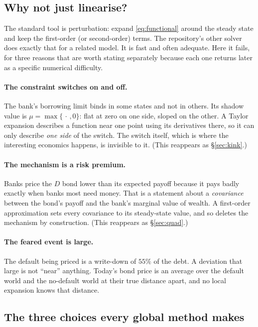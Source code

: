\documentclass[10pt,a4paper]{article}
\theoremstyle{plain}
\theoremstyle{remark}
\begin{document}
\subsection{Why not just linearise?}

The standard tool is perturbation: expand \eqref{eq:functional} around the steady state and
keep the first-order (or second-order) terms. The repository's other solver does exactly
that for a related model. It is fast and often adequate. Here it fails, for three reasons
that are worth stating separately because each one returns later as a specific numerical
difficulty.

\paragraph{The constraint switches on and off.} The bank's borrowing limit binds in some
states and not in others. Its shadow value is $\mu = \max\{\,\cdot\,, 0\}$: flat at zero
on one side, sloped on the other. A Taylor expansion describes a function near one point
using its derivatives there, so it can only describe \emph{one side} of the switch. The
switch itself, which is where the interesting economics happens, is invisible to it.
(This reappears as \S\ref{sec:kink}.)

\paragraph{The mechanism is a risk premium.} Banks price the $D$ bond lower than its expected
payoff because it pays badly exactly when banks most need money. That is a statement about a
\emph{covariance} between the bond's payoff and the bank's marginal value of wealth. A
first-order approximation sets every covariance to its steady-state value, and so deletes the
mechanism by construction. (This reappears as \S\ref{sec:quad}.)

\paragraph{The feared event is large.} The default being priced is a write-down of $55\%$ of
the debt. A deviation that large is not ``near'' anything. Today's bond price is an average
over the default world and the no-default world at their true distance apart, and no local
expansion knows that distance.

\subsection{The three choices every global method makes}
\end{document}
